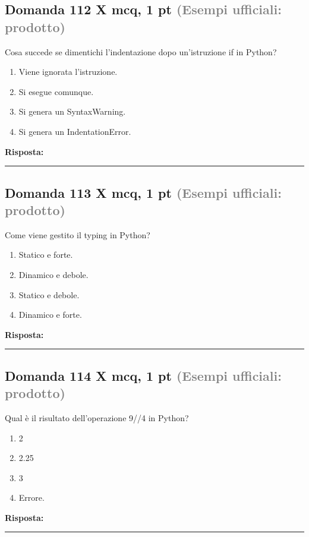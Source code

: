\documentclass[a4paper,11pt]{article}
\begin{document}
\subsection*{Domanda 112 X \hfill {\small mcq, 1 pt \textcolor{gray}{(Esempi ufficiali: prodotto)}}}
Cosa succede se dimentichi l'indentazione dopo un'istruzione if in Python?

\begin{enumerate}[label=\alph*)]
\item Viene ignorata l'istruzione.
\item Si esegue comunque.
\item Si genera un SyntaxWarning.
\item Si genera un IndentationError.
\end{enumerate}
\vspace{0.2cm}
\noindent\textbf{Risposta:}\par
\vspace{1.5cm}\hrule


\subsection*{Domanda 113 X \hfill {\small mcq, 1 pt \textcolor{gray}{(Esempi ufficiali: prodotto)}}}
Come viene gestito il typing in Python?

\begin{enumerate}[label=\alph*)]
\item Statico e forte.
\item Dinamico e debole.
\item Statico e debole.
\item Dinamico e forte.
\end{enumerate}
\vspace{0.2cm}
\noindent\textbf{Risposta:}\par
\vspace{1.5cm}\hrule


\subsection*{Domanda 114 X \hfill {\small mcq, 1 pt \textcolor{gray}{(Esempi ufficiali: prodotto)}}}
Qual è il risultato dell'operazione 9//4 in Python?

\begin{enumerate}[label=\alph*)]
\item 2
\item 2.25
\item 3
\item Errore.
\end{enumerate}
\vspace{0.2cm}
\noindent\textbf{Risposta:}\par
\vspace{1.5cm}\hrule
\end{document}
